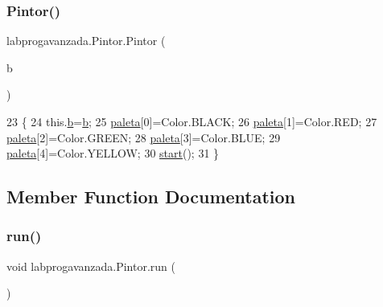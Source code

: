 \subsubsection{\texorpdfstring{Pintor()}{Pintor()}}
{\footnotesize\ttfamily labprogavanzada.\+Pintor.\+Pintor (\begin{DoxyParamCaption}\item[{J\+Button}]{b }\end{DoxyParamCaption})\hspace{0.3cm}{\ttfamily [inline]}}


\begin{DoxyCode}
23                             \{
24         this.\mbox{\hyperlink{classlabprogavanzada_1_1_pintor_a171f3004a9b9e99f64e81de4c1257d6f}{b}}=\mbox{\hyperlink{classlabprogavanzada_1_1_pintor_a171f3004a9b9e99f64e81de4c1257d6f}{b}};
25         \mbox{\hyperlink{classlabprogavanzada_1_1_pintor_aa726e5f94f03e7e1ee20eb9995e368e5}{paleta}}[0]=Color.BLACK;
26         \mbox{\hyperlink{classlabprogavanzada_1_1_pintor_aa726e5f94f03e7e1ee20eb9995e368e5}{paleta}}[1]=Color.RED;
27         \mbox{\hyperlink{classlabprogavanzada_1_1_pintor_aa726e5f94f03e7e1ee20eb9995e368e5}{paleta}}[2]=Color.GREEN;
28         \mbox{\hyperlink{classlabprogavanzada_1_1_pintor_aa726e5f94f03e7e1ee20eb9995e368e5}{paleta}}[3]=Color.BLUE;
29         \mbox{\hyperlink{classlabprogavanzada_1_1_pintor_aa726e5f94f03e7e1ee20eb9995e368e5}{paleta}}[4]=Color.YELLOW;
30         \mbox{\hyperlink{namespaceejemplo_1_1clase_abcf43191f0ecf3b071ca2db7696ba821}{start}}();
31     \}
\end{DoxyCode}


\subsection{Member Function Documentation}
\mbox{\label{classlabprogavanzada_1_1_pintor_a8bf856de5794d5fd6efe70f3b04802a0}} 
\subsubsection{\texorpdfstring{run()}{run()}}
{\footnotesize\ttfamily void labprogavanzada.\+Pintor.\+run (\begin{DoxyParamCaption}{ }\end{DoxyParamCaption})\hspace{0.3cm}{\ttfamily [inline]}}



